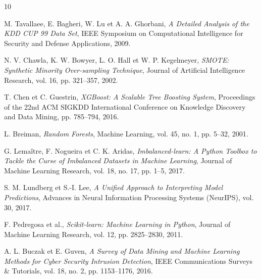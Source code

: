 \documentclass[12pt,a4paper]{report}
\begin{document}
\begin{thebibliography}{10}

M. Tavallaee, E. Bagheri, W. Lu et A. A. Ghorbani,
\textit{A Detailed Analysis of the KDD CUP 99 Data Set},
IEEE Symposium on Computational Intelligence for Security and Defense Applications, 2009.

N. V. Chawla, K. W. Bowyer, L. O. Hall et W. P. Kegelmeyer,
\textit{SMOTE: Synthetic Minority Over-sampling Technique},
Journal of Artificial Intelligence Research, vol. 16, pp. 321--357, 2002.

T. Chen et C. Guestrin,
\textit{XGBoost: A Scalable Tree Boosting System},
Proceedings of the 22nd ACM SIGKDD International Conference on Knowledge Discovery and Data Mining, pp. 785--794, 2016.

L. Breiman,
\textit{Random Forests},
Machine Learning, vol. 45, no. 1, pp. 5--32, 2001.

G. Lemaître, F. Nogueira et C. K. Aridas,
\textit{Imbalanced-learn: A Python Toolbox to Tackle the Curse of Imbalanced Datasets in Machine Learning},
Journal of Machine Learning Research, vol. 18, no. 17, pp. 1--5, 2017.

S. M. Lundberg et S.-I. Lee,
\textit{A Unified Approach to Interpreting Model Predictions},
Advances in Neural Information Processing Systems (NeurIPS), vol. 30, 2017.

F. Pedregosa et al.,
\textit{Scikit-learn: Machine Learning in Python},
Journal of Machine Learning Research, vol. 12, pp. 2825--2830, 2011.

A. L. Buczak et E. Guven,
\textit{A Survey of Data Mining and Machine Learning Methods for Cyber Security Intrusion Detection},
IEEE Communications Surveys \& Tutorials, vol. 18, no. 2, pp. 1153--1176, 2016.

\end{thebibliography}
\end{document}
